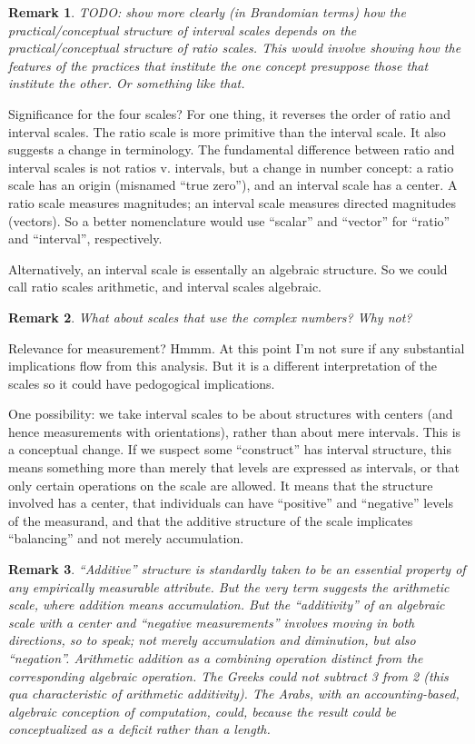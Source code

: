 \documentclass[11pt,twoside]{article}
\newtheorem{remark}{Remark}
\begin{document}
\begin{remark}
TODO: show more clearly (in Brandomian terms) how the
practical/conceptual structure of interval scales depends on the
practical/conceptual structure of ratio scales.  This would involve
showing how the features of the practices that institute the one
concept presuppose those that institute the other.  Or something like
that.
\end{remark}

Significance for the four scales?  For one thing, it reverses the
order of ratio and interval scales.  The ratio scale is more primitive
than the interval scale.  It also suggests a change in terminology.
The fundamental difference between ratio and interval scales is not
ratios v. intervals, but a change in number concept: a ratio scale has
an origin (misnamed ``true zero''), and an interval scale has a
center.  A ratio scale measures magnitudes; an interval scale measures
directed magnitudes (vectors).  So a better nomenclature would use
``scalar'' and ``vector'' for ``ratio'' and ``interval'',
respectively.

Alternatively, an interval scale is essentally an algebraic structure.
So we could call ratio scales arithmetic, and interval scales
algebraic.

\begin{remark}
  What about scales that use the complex numbers?  Why not?
\end{remark}

Relevance for measurement?  Hmmm.  At this point I'm not sure if any
substantial implications flow from this analysis.  But it is a
different interpretation of the scales so it could have pedogogical
implications.

One possibility: we take interval scales to be about structures with
centers (and hence measurements with orientations), rather than about
mere intervals.  This is a conceptual change.  If we suspect some
``construct'' has interval structure, this means something more than
merely that levels are expressed as intervals, or that only certain
operations on the scale are allowed.  It means that the structure
involved has a center, that individuals can have ``positive'' and
``negative'' levels of the measurand, and that the additive structure
of the scale implicates ``balancing'' and not merely accumulation.

\begin{remark}
``Additive'' structure is standardly taken to be an essential property
  of any empirically measurable attribute.  But the very term suggests
  the arithmetic scale, where addition means accumulation.  But the
  ``additivity'' of an algebraic scale with a center and ``negative
  measurements'' involves moving in both directions, so to speak; not
  merely accumulation and diminution, but also ``negation''.
  Arithmetic addition as a combining operation distinct from the
  corresponding algebraic operation.  The Greeks could not subtract 3
  from 2 (this qua characteristic of arithmetic additivity).  The
  Arabs, with an accounting-based, algebraic conception of
  computation, could, because the result could be conceptualized as a
  deficit rather than a length.
\end{remark}
\end{document}
